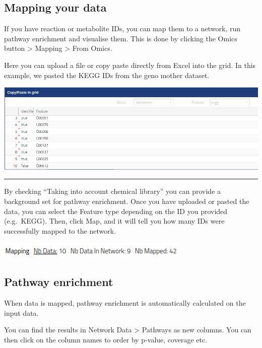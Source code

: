 \documentclass[
  24px,
  letterpaper,
  DIV=11,
  numbers=noendperiod]{scrartcl}
\begin{document}
\hypertarget{mapping-your-data}{%
\subsection{Mapping your data}\label{mapping-your-data}}

If you have reaction or metabolite IDs, you can map them to a network,
run pathway enrichment and visualise them. This is done by clicking the
Omics button \textgreater{} Mapping \textgreater{} From Omics.

Here you can upload a file or copy paste directly from Excel into the
grid. In this example, we pasted the KEGG IDs from the geno mother
dataset.

\includegraphics{images/metexplore_id_pasted.png}

\begin{center}\rule{0.5\linewidth}{0.5pt}\end{center}

By checking ``Taking into account chemical library'' you can provide a
background set for pathway enrichment. Once you have uploaded or pasted
the data, you can select the Feature type depending on the ID you
provided (e.g.~KEGG). Then, click Map, and it will tell you how many IDs
were successfully mapped to the network.

\includegraphics{images/metexplore_mapping_results.png}

\hypertarget{pathway-enrichment}{%
\subsection{Pathway enrichment}\label{pathway-enrichment}}

When data is mapped, pathway enrichment is automatically calculated on
the input data.

You can find the results in Network Data \textgreater{} Pathways as new
columns. You can then click on the column names to order by p-value,
coverage etc.
\end{document}
